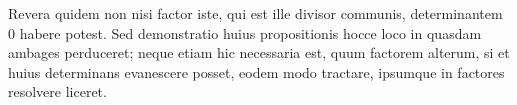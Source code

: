 \expandafter\def\csname HistoricalNoteText11\endcsname{Revera quidem non nisi factor iste, qui est ille divisor communis, determinantem 0 habere potest.
Sed demonstratio huius propositionis hocce loco in quasdam ambages perduceret; neque etiam hic necessaria
est, quum factorem alterum, si et huius determinans evanescere posset, eodem modo tractare, ipsumque in
factores resolvere liceret.}
